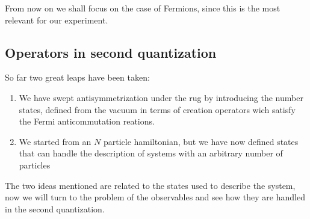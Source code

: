 \documentclass[11pt,letter]{article}
\begin{document}
From now on we shall focus on the case of Fermions, since this is the most
relevant for our experiment.  

\subsection{Operators in second quantization}

So far two great leaps have been taken: 
\begin{enumerate}
 \item We have
swept antisymmetrization under the rug by introducing the number states,
defined from the vacuum in terms of creation operators wich satisfy the Fermi anticommutation reations.  
 \item We started from an $N$ particle hamiltonian, but we have now defined states that can handle the description of systems with an arbitrary number of particles 
\end{enumerate}
The two ideas mentioned are related to the states used to describe the system, now we will turn to the problem of the observables and see how they are handled in the second quantization.  
\end{document}
